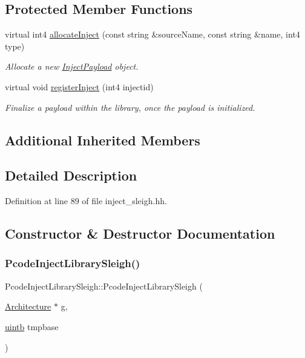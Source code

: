\subsection*{Protected Member Functions}
\begin{DoxyCompactItemize}
\item 
virtual int4 \mbox{\hyperlink{class_pcode_inject_library_sleigh_abb567ddc0d8f5e05d96fc87a87f72c34}{allocate\+Inject}} (const string \&source\+Name, const string \&name, int4 type)
\begin{DoxyCompactList}\small\item\em Allocate a new \mbox{\hyperlink{class_inject_payload}{Inject\+Payload}} object. \end{DoxyCompactList}\item 
virtual void \mbox{\hyperlink{class_pcode_inject_library_sleigh_a8aa3b83b22fef0799e95dfaf346ca89e}{register\+Inject}} (int4 injectid)
\begin{DoxyCompactList}\small\item\em Finalize a payload within the library, once the payload is initialized. \end{DoxyCompactList}\end{DoxyCompactItemize}
\subsection*{Additional Inherited Members}


\subsection{Detailed Description}


Definition at line 89 of file inject\+\_\+sleigh.\+hh.



\subsection{Constructor \& Destructor Documentation}
\mbox{\label{class_pcode_inject_library_sleigh_a25188bce489eae0287ce89d8588b961a}} 
\subsubsection{\texorpdfstring{PcodeInjectLibrarySleigh()}{PcodeInjectLibrarySleigh()}}
{\footnotesize\ttfamily Pcode\+Inject\+Library\+Sleigh\+::\+Pcode\+Inject\+Library\+Sleigh (\begin{DoxyParamCaption}\item[{\mbox{\hyperlink{class_architecture}{Architecture}} $\ast$}]{g,  }\item[{\mbox{\hyperlink{types_8h_a2db313c5d32a12b01d26ac9b3bca178f}{uintb}}}]{tmpbase }\end{DoxyParamCaption})}



